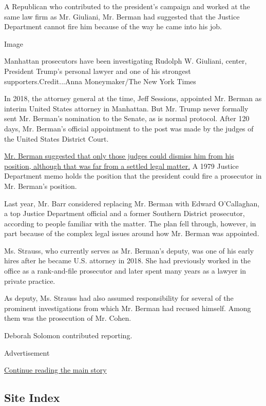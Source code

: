 A Republican who contributed to the president's campaign and worked at
the same law firm as Mr. Giuliani, Mr. Berman had suggested that the
Justice Department cannot fire him because of the way he came into his
job.

Image

Manhattan prosecutors have been investigating Rudolph W. Giuliani,
center, President Trump's personal lawyer and one of his strongest
supporters.Credit...Anna Moneymaker/The New York Times

In 2018, the attorney general at the time, Jeff Sessions, appointed Mr.
Berman as interim United States attorney in Manhattan. But Mr. Trump
never formally sent Mr. Berman's nomination to the Senate, as is normal
protocol. After 120 days, Mr. Berman's official appointment to the post
was made by the judges of the United States District Court.

\href{https://www.nytimes.com/2020/06/20/us/politics/geoff-berman-who-can-fire.html}{Mr.
Berman suggested that only those judges could dismiss him from his
position, although that was far from a settled legal matter.} A 1979
Justice Department memo holds the position that the president could fire
a prosecutor in Mr. Berman's position.

Last year, Mr. Barr considered replacing Mr. Berman with Edward
O'Callaghan, a top Justice Department official and a former Southern
District prosecutor, according to people familiar with the matter. The
plan fell through, however, in part because of the complex legal issues
around how Mr. Berman was appointed.

Ms. Strauss, who currently serves as Mr. Berman's deputy, was one of his
early hires after he became U.S. attorney in 2018. She had previously
worked in the office as a rank-and-file prosecutor and later spent many
years as a lawyer in private practice.

As deputy, Ms. Strauss had also assumed responsibility for several of
the prominent investigations from which Mr. Berman had recused himself.
Among them was the prosecution of Mr. Cohen.

Deborah Solomon contributed reporting.

Advertisement

\protect\hyperlink{after-bottom}{Continue reading the main story}

\hypertarget{site-index}{%
\subsection{Site Index}\label{site-index}}

